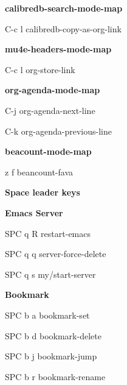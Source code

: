 \documentclass[10pt]{article}
\renewcommand\section[1]{\bigskip\par\textbf{\color{heading}\large#1}\smallskip}
\renewcommand\subsection[1]{\smallskip\par\textbf{\color{heading}#1}}
\begin{document}
\begin{multicols}{4}
  \subsection{calibredb-search-mode-map}
  \begin{keylist}
    \item[C-c l] calibredb-copy-as-org-link
  \end{keylist}

  \subsection{mu4e-headers-mode-map}
  \begin{keylist}
    \item[C-c l] org-store-link
  \end{keylist}

  \subsection{org-agenda-mode-map}
  \begin{keylist}
    \item[C-j] org-agenda-next-line
    \item[C-k] org-agenda-previous-line
  \end{keylist}

  \subsection{beacount-mode-map}
  \begin{keylist}
    \item[z f] beancount-fava
  \end{keylist}


  \section{Space leader keys}
  \subsection{Emacs Server}
  \begin{keylist}
    \item[SPC q R] restart-emacs
    \item[SPC q q] server-force-delete
    \item[SPC q s] my/start-server
  \end{keylist}

  \subsection{Bookmark}
  \begin{keylist}
    \item[SPC b a] bookmark-set
    \item[SPC b d] bookmark-delete
    \item[SPC b j] bookmark-jump
    \item[SPC b r] bookmark-rename
  \end{keylist}


\end{multicols}
\end{document}
